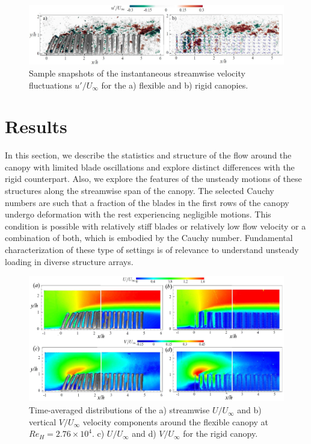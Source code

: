 \documentclass[lineno,authoryear]{FLO_v1}%
\theoremstyle{definition}
\begin{document}
\begin{figure}
	\centering
	\includegraphics[width=1\linewidth]{Inst}
	\caption{Sample snapshots of the instantaneous streamwise velocity fluctuations $u'/U_{\infty}$ for the a) flexible and b) rigid canopies.}  
	\label{inst}
\end{figure} 

\section{Results}
In this section, we describe the statistics and structure of the flow around the canopy with limited blade  oscillations and explore distinct differences with the rigid counterpart. Also, we explore the features of the unsteady motions of these structures along the streamwise span of the canopy. 
The selected Cauchy numbers are such that a fraction of the blades in the first rows of the canopy undergo deformation with the rest experiencing negligible motions. This condition is possible with relatively stiff blades or relatively low flow velocity or a combination of both, which is embodied by the Cauchy number. Fundamental characterization of these type of settings is of relevance to understand unsteady loading in diverse structure arrays.


\begin{figure}
	\centering
	\includegraphics[width=1\linewidth]{Mean_U}
	\caption{Time-averaged distributions of the a) streamwise $U/U_{\infty}$ and b) vertical $V/U_{\infty}$ velocity components around the flexible canopy at $Re_H = 2.76\times 10^4$. c) $U/U_{\infty}$ and d) $V/U_{\infty}$ for the rigid canopy.}  
	\label{u_mean}
\end{figure}  
\end{document}
